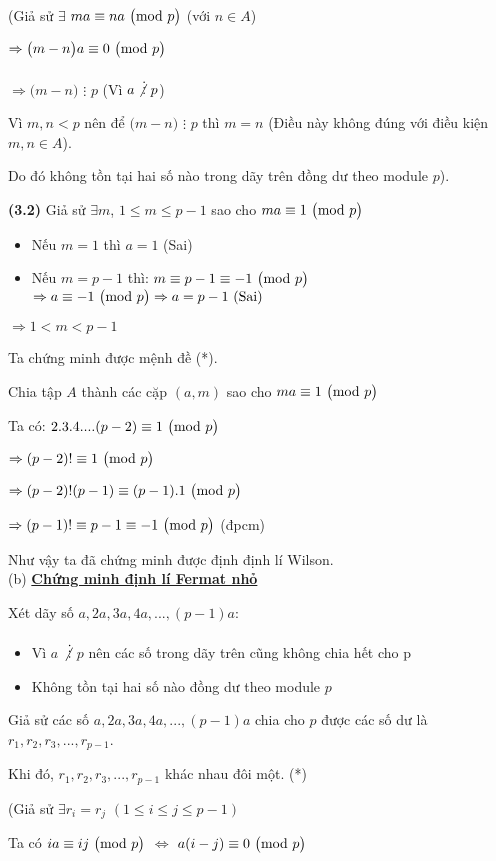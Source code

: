 \big(Giả sử $\exists$ $ma \equiv na \ \big( \mathrm{mod}\ p \big)$ (với $n \in A$) 

$\Rightarrow \big(m - n\big) a \equiv 0 \ \big( \mathrm{mod}\ p \big)$

$\Rightarrow \big(m - n\big)$ $\vdots$ $p$ (Vì $a \not \vdots \text{ } p$)

Vì $m, n < p$ nên để $\big(m - n\big)$ $\vdots$ $p$ thì $m = n$ (Điều này không đúng với điều kiện $m, n \in A$).

Do đó không tồn tại hai số nào trong dãy trên đồng dư theo module $p$\big).

\textbf{(3.2)} Giả sử $\exists m$, $1 \leq m \leq p-1$ sao cho $ma \equiv 1 \ \big( \mathrm{mod}\ p \big)$
\begin{itemize}
    \item Nếu $m = 1$ thì $a = 1$ (Sai)
    \item Nếu $m = p - 1$ thì: $m \equiv p - 1 \equiv -1 \ \big( \mathrm{mod}\ p \big)$
    $\Rightarrow a \equiv -1 \ \big( \mathrm{mod}\ p \big) \Rightarrow a = p - 1 \text{ (Sai)}$
\end{itemize}
$\Rightarrow 1 < m < p - 1$

Ta chứng minh được mệnh đề (*).

Chia tập $A$ thành các cặp $(a, m)$ sao cho $ma \equiv 1 \ \big( \mathrm{mod}\ p \big)$

Ta có: $2.3.4....(p-2) \equiv 1 \ \big( \mathrm{mod}\ p \big)$

$\Rightarrow (p-2)! \equiv 1 \ \big( \mathrm{mod}\ p \big)$

$\Rightarrow (p-2)!(p-1) \equiv (p-1).1 \ \big( \mathrm{mod}\ p \big)$

$\Rightarrow (p-1)! \equiv p-1 \equiv -1 \ \big( \mathrm{mod}\ p \big)$ (đpcm)

Như vậy ta đã chứng minh được định định lí Wilson.
\\[11pt]
(b) \textbf{\underline{Chứng minh định lí Fermat nhỏ}}

Xét dãy số $a, 2a, 3a, 4a,..., (p-1)a$:
\begin{itemize}
    \item Vì $a$ $\not \vdots$ $p$ nên các số trong dãy trên cũng không chia hết cho p
    \item Không tồn tại hai số nào đồng dư theo module $p$
\end{itemize}

Giả sử các số $a, 2a, 3a, 4a,...,(p-1)a$ chia cho $p$ được các số dư là $r_1, r_2, r_3,...,r_{p-1}$.

Khi đó, $r_1, r_2, r_3,...,r_{p-1}$ khác nhau đôi một. (*)

\big(Giả sử $\exists r_i = r_j$ $(1 \leq i \leq j \leq p-1)$

Ta có $ia \equiv ij \ \big( \mathrm{mod}\ p \big)$ $\Leftrightarrow$ $a(i - j) \equiv 0 \ \big( \mathrm{mod}\ p \big)$

